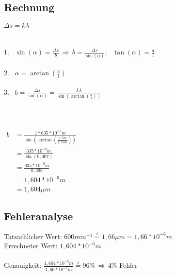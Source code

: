 \documentclass[12pt, a4paper]{article}
\begin{document}
\subsection*{Rechnung}
$\Delta s = k \lambda$\\
\\
\\
$1.$ \, $\sin\left(\alpha\right) = \frac{\Delta s}{b} \, \Rightarrow \, b = \frac{\Delta s}{\sin\left(\alpha\right)}$; \, $\tan\left(\alpha\right) = \frac{a}{l}$\\
\\
$2.$ \, $\alpha = \arctan\left(\frac{a}{l}\right)$\\
\\
$3.$ \, $b = \frac{\Delta s}{\sin\left(\alpha\right)} = \frac{k\lambda}{\sin\left(\arctan\left(\frac{a}{l}\right)\right)}$\\
\\
\\
\\
$\begin{aligned}
    b &= \frac{1*635*10^{-9}m}{\sin\left(\arctan\left(\frac{0,5m}{1,16m}\right)\right)}\\
      &= \frac{635*10^{-9}m}{\sin\left(0,407\right)}\\
      &= \frac{635*10^{-9}m}{0,396}\\
      &= 1,604*10^{-6}m\\
      &= 1,604\mu m
\end{aligned}$

\subsection*{Fehleranalyse}
Tatsächlicher Wert: $600 mm^{-1} \overset{\wedge}{=} 1,66\mu m = 1,66*10^{-6}m$\\
Errechneter Wert: $1,604*10^{-6}m$\\
\\
Genauigkeit: $\frac{1,604*10^{-6}m}{1,66*10^{-6}m} \overset{\wedge}{=} 96\% \, \Rightarrow \, 4\%$ Fehler
\end{document}
